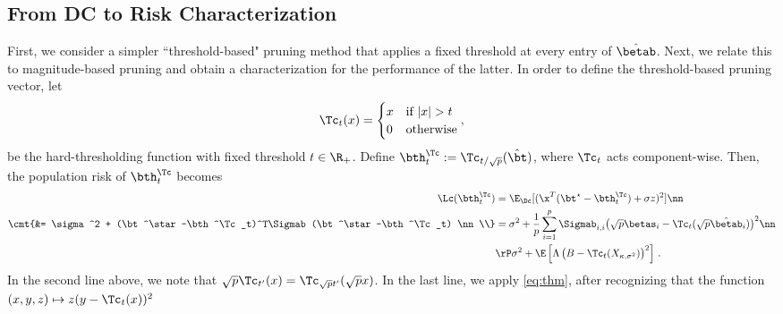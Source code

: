 \subsection{From DC to Risk Characterization}\label{sec:risk}
First, we consider a simpler ``threshold-based" pruning method that applies a fixed threshold at every entry of $\hat\betab$. Next, we relate this to magnitude-based pruning and obtain a characterization for the performance of the latter.
%
In order to define the threshold-based pruning vector, let \[
\Tc_t(x) = \begin{cases} x & \text{if } |x|>t \\ 0 & \text{otherwise} \end{cases},
\] be the hard-thresholding function with fixed threshold $t\in\R_+$. Define $\bth^\Tc_{t} := \Tc_{t/\sqrt{p}}(\hat\bt)$, where $\Tc_t$ acts component-wise. Then, the population risk of   $\bth^\Tc_t$ becomes
\begin{align}
\Lc(\bth^\Tc_t) &= \E_{\Dc}[(\x^T(\bt^\star-\bth^\Tc_t) + \sigma z)^2] \nn\\
 \cmt{&= \sigma^2 + (\bt^\star-\bth^\Tc_t)^T\Sigmab(\bt^\star-\bth^\Tc_t) \nn \\}
  &= \sigma^2 + \frac{1}{p}\sum_{i=1}^p\Sigmab_{i,i}\big(\sqrt{p}\betas_i-\Tc_{t}(\sqrt{p}\hat\betab_i)\big)^2\nn\\
  &\rP \sigma^2 + \E\left[ \Lambda\left(B-\Tc_t(X_{\kappa,\sigma^2})\right)^2 \right]\,.
  \label{eq:loss_w2}
\end{align}
In the second line above, we note that $\sqrt{p}\Tc_{t'}(x)=\Tc_{\sqrt{p}t'}(\sqrt{p}x)$. In the last line, we apply \eqref{eq:thm}, after recognizing that the function $(x,y,z)\mapsto z(y-\Tc_t(x))^2$ 
